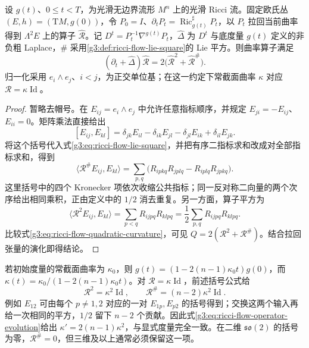 \begin{proposition}\label{g3:prop:ricci-flow-operator-evolution}
	设 \(g(t)\)、\(0\le t<T\)，为光滑无边界流形 \(M^n\) 上的光滑 Ricci 流。固定欧氏丛 \((E,h)=(\mathrm TM,g(0))\)，令 \(P_0=I\)、\(\partial_tP_t=\operatorname{Ric}_{g(t)}^\sharp P_t\)，以 \(P_t\) 拉回当前曲率得到 \(\Lambda^2E\) 上的算子 \(\widehat{\mathcal R}\)。记 \(D^t=P_t^{-1}\nabla^{g(t)}P_t\)，\(\widehat\Delta\) 为 \(D^t\) 与底度量 \(g(t)\) 定义的非负粗 Laplace，\(\#\) 采用\cref{g3:def:ricci-flow-lie-square}的 Lie 平方。则曲率算子满足
	\begin{equation}\label{g3:eq:ricci-flow-operator-evolution}
		(\partial_t+\widehat\Delta)\widehat{\mathcal R}
		=2\bigl(\widehat{\mathcal R}^{2}
		+\widehat{\mathcal R}^{\#}\bigr).
	\end{equation}
	归一化采用 \(e_i\wedge e_j\)、\(i<j\)，为正交单位基；在这一约定下常截面曲率 \(\kappa\) 对应 \(\mathcal R=\kappa\operatorname{Id}\)。
\end{proposition}
\begin{proof}
	暂略去帽号。在 \(E_{ij}=e_i\wedge e_j\) 中允许任意指标顺序，并规定 \(E_{ji}=-E_{ij}\)、\(E_{ii}=0\)。矩阵乘法直接给出
	\[
		[E_{ij},E_{kl}]
		=\delta_{jk}E_{il}-\delta_{ik}E_{jl}
		-\delta_{jl}E_{ik}+\delta_{il}E_{jk}.
	\]
	将这个括号代入式\eqref{g3:eq:ricci-flow-lie-square}，并把有序二指标求和改成对全部指标求和，得到
	\[
		\langle\mathcal R^\# E_{ij},E_{kl}\rangle
		=\sum_{p,q}\bigl(R_{ipkq}R_{jplq}-R_{iplq}R_{jpkq}\bigr).
	\]
	这里括号中的四个 Kronecker 项依次收缩公共指标；同一反对称二向量的两个次序给出相同乘积，正由定义中的 \(1/2\) 消去重复。另一方面，算子平方为
	\[
		\langle\mathcal R^2 E_{ij},E_{kl}\rangle
		=\sum_{p<q}R_{ijpq}R_{klpq}
		=\frac12\sum_{p,q}R_{ijpq}R_{klpq}.
	\]
	比较式\eqref{g3:eq:ricci-flow-quadratic-curvature}，可见 \(Q=2(\mathcal R^2+\mathcal R^\#)\)。结合拉回张量的演化即得结论。
\end{proof}

\begin{example}\label{g3:exm:ricci-flow-curvature-factor-check}
	若初始度量的常截面曲率为 \(\kappa_0\)，则 \(g(t)=(1-2(n-1)\kappa_0t)g(0)\)，而
	\(\kappa(t)=\kappa_0/(1-2(n-1)\kappa_0t)\)。对 \(\mathcal R=\kappa\operatorname{Id}\)，前述括号公式给
	\[
		\mathcal R^2=\kappa^2\operatorname{Id},\qquad
		\mathcal R^\#=(n-2)\kappa^2\operatorname{Id}.
	\]
	例如 \(E_{12}\) 可由每个 \(p\ne1,2\) 对应的一对 \(E_{1p},E_{p2}\) 的括号得到；交换这两个输入再给一次相同的平方，\(1/2\) 留下 \(n-2\) 个贡献。因此式\eqref{g3:eq:ricci-flow-operator-evolution}给出 \(\kappa'=2(n-1)\kappa^2\)，与显式度量完全一致。在二维 \(\mathfrak{so}(2)\) 的括号为零，\(\mathcal R^\#=0\)，但三维及以上通常必须保留这一项。
\end{example}

